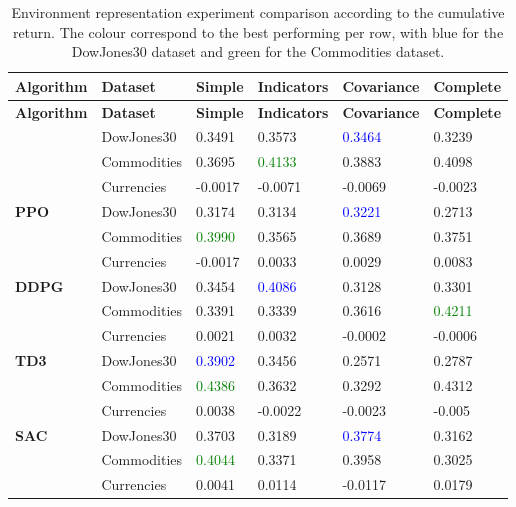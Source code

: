 \begin{longtable}{|p{2cm}|p{2.2cm}|p{2cm}|p{2cm}|p{2.2cm}|p{2cm}|}
    \caption{Environment representation experiment comparison according to the cumulative return. The colour correspond to the best performing per row, with blue for the DowJones30 dataset and green for the Commodities dataset.}
    \label{tab:experiment_environment_cumulative}
    \\ 
    \hline
    \textbf{Algorithm} & \textbf{Dataset} & \textbf{Simple} & \textbf{Indicators} & \textbf{Covariance} & \textbf{Complete} \\ \midrule
    \endfirsthead

    \hline
    \textbf{Algorithm} & \textbf{Dataset} & \textbf{Simple} & \textbf{Indicators} & \textbf{Covariance} & \textbf{Complete}  \\ \midrule
    \endhead

    \endfoot

    \hline  
    \multirow{3}{*}{\textbf{A2C}}
    & DowJones30 & 0.3491 & 0.3573 & \textcolor{blue}{0.3464} & 0.3239 \\ \cline{2-6}
    & Commodities & 0.3695 & \textcolor{green}{0.4133} & 0.3883 & 0.4098 \\ \cline{2-6}
    & Currencies & -0.0017 & -0.0071 & -0.0069 & -0.0023 \\ \midrule

    \multirow{3}{*}{\textbf{PPO}}
    & DowJones30 & 0.3174 & 0.3134 & \textcolor{blue}{0.3221} & 0.2713 \\ \cline{2-6}
    & Commodities & \textcolor{green}{0.3990} & 0.3565 & 0.3689 & 0.3751 \\ \cline{2-6}
    & Currencies & -0.0017 & 0.0033 & 0.0029 & 0.0083 \\ \midrule

    \multirow{3}{*}{\textbf{DDPG}}
    & DowJones30 & 0.3454 & \textcolor{blue}{0.4086} & 0.3128 & 0.3301 \\ \cline{2-6}
    & Commodities & 0.3391 & 0.3339 & 0.3616 & \textcolor{green}{0.4211} \\ \cline{2-6}
    & Currencies & 0.0021 & 0.0032 & -0.0002 & -0.0006 \\ \midrule

    \multirow{3}{*}{\textbf{TD3}}
    & DowJones30 & \textcolor{blue}{0.3902} & 0.3456 & 0.2571 & 0.2787 \\ \cline{2-6}
    & Commodities & \textcolor{green}{0.4386} & 0.3632 & 0.3292 & 0.4312 \\ \cline{2-6}
    & Currencies & 0.0038 & -0.0022 & -0.0023 & -0.005 \\ \midrule

    \multirow{3}{*}{\textbf{SAC}}
    & DowJones30 & 0.3703 & 0.3189 & \textcolor{blue}{0.3774} & 0.3162 \\ \cline{2-6}
    & Commodities & \textcolor{green}{0.4044} & 0.3371 & 0.3958 & 0.3025 \\ \cline{2-6}
    & Currencies & 0.0041 & 0.0114 & -0.0117 & 0.0179 \\ \midrule
\end{longtable}